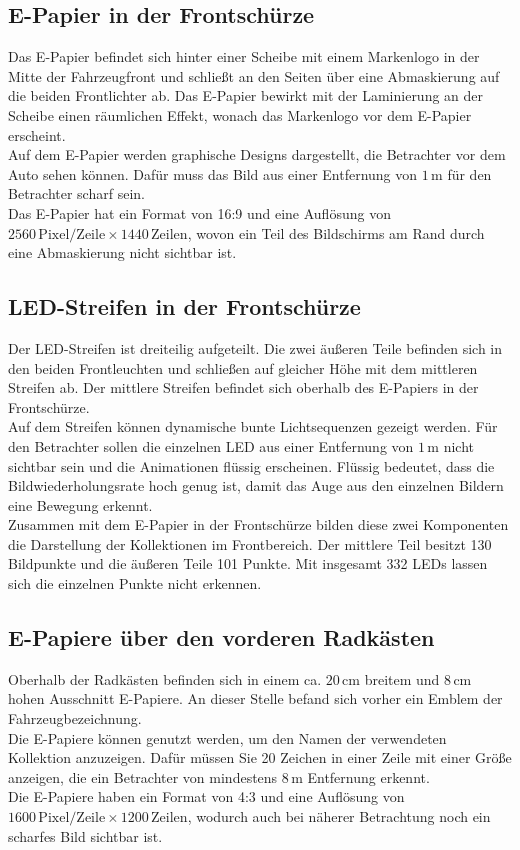 \subsection{E-Papier in der Frontschürze}
Das E-Papier befindet sich hinter einer Scheibe mit einem Markenlogo in der Mitte der Fahrzeugfront und schließt an den Seiten über eine Abmaskierung auf die beiden Frontlichter ab. Das E-Papier bewirkt mit der Laminierung an der Scheibe einen räumlichen Effekt, wonach das Markenlogo vor dem E-Papier erscheint. \\
Auf dem E-Papier werden graphische Designs dargestellt, die Betrachter vor dem Auto sehen können. Dafür muss das Bild aus einer Entfernung von $ 1\,\mathrm{m} $  für den Betrachter scharf sein. \\
Das E-Papier hat ein Format von 16:9 und eine Auflösung von  $ 2560\,\mathrm{Pixel}/\mathrm{Zeile} \times 1440\,\mathrm{Zeilen} $, wovon ein Teil des Bildschirms am Rand durch eine Abmaskierung nicht sichtbar ist.
\subsection{LED-Streifen in der Frontschürze}
Der LED-Streifen ist dreiteilig aufgeteilt. Die zwei äußeren Teile befinden sich in den beiden Frontleuchten und schließen auf gleicher Höhe mit dem mittleren Streifen ab. Der mittlere Streifen befindet sich oberhalb des E-Papiers in der Frontschürze. \\
Auf dem Streifen können dynamische bunte Lichtsequenzen gezeigt werden. Für den Betrachter sollen die einzelnen LED aus einer Entfernung von $ 1\,\mathrm{m} $ nicht sichtbar sein und die Animationen flüssig erscheinen. Flüssig bedeutet, dass die Bildwiederholungsrate hoch genug ist, damit das Auge aus den einzelnen Bildern eine Bewegung erkennt. \\
Zusammen mit dem E-Papier in der Frontschürze bilden diese zwei
Komponenten die Darstellung der Kollektionen im Frontbereich. Der mittlere Teil besitzt 130 Bildpunkte und die äußeren Teile 101 Punkte. Mit insgesamt 332 LEDs lassen sich die einzelnen Punkte nicht erkennen.
\subsection{E-Papiere über den vorderen Radkästen}
Oberhalb der Radkästen befinden sich in einem ca. $ 20\,\mathrm{cm} $ breitem und $ 8\,\mathrm{cm} $ hohen Ausschnitt E-Papiere. An dieser Stelle befand sich vorher ein Emblem der Fahrzeugbezeichnung. \\
Die E-Papiere können genutzt werden, um den Namen der verwendeten Kollektion anzuzeigen. Dafür müssen Sie 20 Zeichen in einer Zeile mit einer Größe anzeigen, die ein Betrachter von mindestens $ 8\,\mathrm{m} $ Entfernung erkennt. \\
Die E-Papiere haben ein Format von 4:3 und eine Auflösung von $ 1600\,\mathrm{Pixel}/\mathrm{Zeile} \times 1200\,\mathrm{Zeilen} $, wodurch auch bei näherer Betrachtung noch ein scharfes Bild sichtbar ist.
